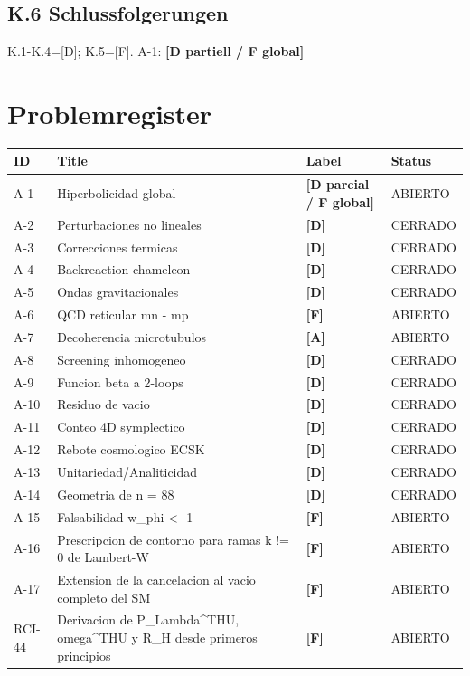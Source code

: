 ﻿\documentclass[11pt,letterpaper]{article}
\begin{document}
\subsection{K.6 Schlussfolgerungen}
K.1-K.4=[D]; K.5=[F]. A-1: \textbf{[D partiell / F global]}
\newpage
\section*{Problemregister}

\begin{longtable}{@{}p{1.2cm}p{6.5cm}p{1.8cm}p{2cm}@{}}
\toprule
\textbf{ID} & \textbf{Title} & \textbf{Label} & \textbf{Status} \\
\midrule
\endhead
A-1 & Hiperbolicidad global & \textcolor{Dgreen}{\textbf{[D parcial / F global]}} & ABIERTO \\
A-2 & Perturbaciones no lineales & \textcolor{Dgreen}{\textbf{[D]}} & CERRADO \\
A-3 & Correcciones termicas & \textcolor{Dgreen}{\textbf{[D]}} & CERRADO \\
A-4 & Backreaction chameleon & \textcolor{Dgreen}{\textbf{[D]}} & CERRADO \\
A-5 & Ondas gravitacionales & \textcolor{Dgreen}{\textbf{[D]}} & CERRADO \\
A-6 & QCD reticular mn - mp & \textcolor{Forange}{\textbf{[F]}} & ABIERTO \\
A-7 & Decoherencia microtubulos & \textcolor{Ayellow}{\textbf{[A]}} & ABIERTO \\
A-8 & Screening inhomogeneo & \textcolor{Dgreen}{\textbf{[D]}} & CERRADO \\
A-9 & Funcion beta a 2-loops & \textcolor{Dgreen}{\textbf{[D]}} & CERRADO \\
A-10 & Residuo de vacio & \textcolor{Dgreen}{\textbf{[D]}} & CERRADO \\
A-11 & Conteo 4D symplectico & \textcolor{Dgreen}{\textbf{[D]}} & CERRADO \\
A-12 & Rebote cosmologico ECSK & \textcolor{Dgreen}{\textbf{[D]}} & CERRADO \\
A-13 & Unitariedad/Analiticidad & \textcolor{Dgreen}{\textbf{[D]}} & CERRADO \\
A-14 & Geometria de n = 88 & \textcolor{Dgreen}{\textbf{[D]}} & CERRADO \\
A-15 & Falsabilidad w\_phi < -1 & \textcolor{Forange}{\textbf{[F]}} & ABIERTO \\
A-16 & Prescripcion de contorno para ramas k != 0 de Lambert-W & \textcolor{Forange}{\textbf{[F]}} & ABIERTO \\
A-17 & Extension de la cancelacion al vacio completo del SM & \textcolor{Forange}{\textbf{[F]}} & ABIERTO \\
RCI-44 & Derivacion de P\_Lambda\textasciicircum{}THU, omega\textasciicircum{}THU y R\_H desde primeros principios & \textcolor{Forange}{\textbf{[F]}} & ABIERTO \\
\bottomrule
\end{longtable}
\end{document}
